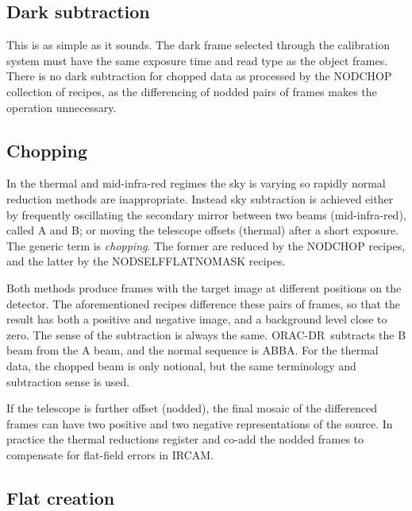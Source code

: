 \documentclass[twoside,11pt]{article}
\newcommand{\htmlref}[2]{#1}
\newcommand{\xlabel}[1]{}
\renewcommand{\_}{\texttt{\symbol{95}}}
\newcommand{\ORACDR}{{\footnotesize ORAC-DR}}
\begin{document}
\subsection{\xlabel{dark_subtraction}Dark subtraction\label{dark_subtraction}}

This is as simple as it sounds.  The dark frame selected through the
\htmlref{calibration system}{calibration_information} must have the same
exposure time and read type as the object frames.  There is no dark
subtraction for chopped data as processed by the NOD\_CHOP collection
of recipes, as the differencing of nodded pairs of frames makes the
operation unnecessary.

\subsection{\xlabel{chopping}Chopping\label{chopping}}

In the thermal and mid-infra-red regimes the sky is varying so rapidly
normal reduction methods are inappropriate.  Instead sky subtraction
is achieved either by frequently oscillating the secondary mirror
between two beams (mid-infra-red), called A and B; or moving the
telescope offsets (thermal) after a short exposure.  The generic term
is {\em chopping}.  The former are reduced by the
\htmlref{NOD\_CHOP}{NOD\_CHOP} recipes, and the latter by the
\htmlref{NOD\_SELF\_FLAT\_NO\_MASK}{NOD\_SELF\_FLAT\_NO\_MASK} recipes.

Both methods produce frames with the target image at different
positions on the detector.  The aforementioned recipes difference
these pairs of frames, so that the result has both a positive and
negative image, and a background level close to zero.  The sense of
the subtraction is always the same.  \ORACDR\ subtracts the B beam
from the A beam, and the normal sequence is ABBA.  For the thermal
data, the chopped beam is only notional, but the same terminology
and subtraction sense is used.

If the telescope is further offset (nodded), the final mosaic of the
differenced frames can have two positive and two negative
representations of the source.  In practice the thermal reductions
register and co-add the nodded frames to compensate for flat-field
errors in IRCAM.

\subsection{\xlabel{flat_creation}Flat creation\label{flat_creation}}
\end{document}

